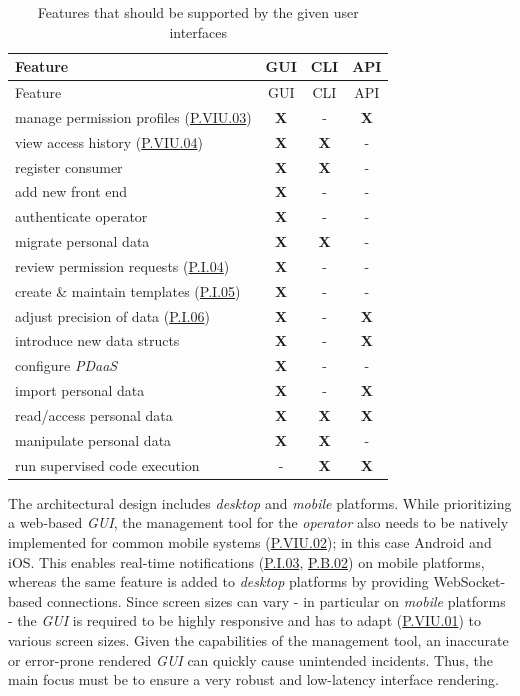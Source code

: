 \documentclass[12pt,english,a4paper,titlepage,cleardoublepage=empty,dottedtoc]{report}
\begin{document}
\begin{longtable}[]{@{}lccc@{}}
\caption{Features that should be supported by the given user interfaces
\label{tbl:ui-features}}\tabularnewline
\toprule
Feature & GUI & CLI & API\tabularnewline
\midrule
\endfirsthead
\toprule
Feature & GUI & CLI & API\tabularnewline
\midrule
\endhead
manage permission profiles (\protect\hyperlink{pviu03}{P.VIU.03}) &
\textbf{X} & - & \textbf{X}\tabularnewline
view access history (\protect\hyperlink{pviu04}{P.VIU.04}) & \textbf{X}
& \textbf{X} & -\tabularnewline
register consumer & \textbf{X} & \textbf{X} & -\tabularnewline
add new front end & \textbf{X} & - & -\tabularnewline
authenticate operator & \textbf{X} & - & -\tabularnewline
migrate personal data & \textbf{X} & \textbf{X} & -\tabularnewline
review permission requests (\protect\hyperlink{pi04}{P.I.04}) &
\textbf{X} & - & -\tabularnewline
create \& maintain templates (\protect\hyperlink{pi05}{P.I.05}) &
\textbf{X} & - & -\tabularnewline
adjust precision of data (\protect\hyperlink{pi06}{P.I.06}) & \textbf{X}
& - & \textbf{X}\tabularnewline
introduce new data structs & \textbf{X} & - & \textbf{X}\tabularnewline
configure \emph{PDaaS} & \textbf{X} & - & -\tabularnewline
import personal data & \textbf{X} & - & \textbf{X}\tabularnewline
read/access personal data & \textbf{X} & \textbf{X} &
\textbf{X}\tabularnewline
manipulate personal data & \textbf{X} & \textbf{X} & -\tabularnewline
run supervised code execution & - & \textbf{X} &
\textbf{X}\tabularnewline
\bottomrule
\end{longtable}

The architectural design includes \emph{desktop} and \emph{mobile}
platforms. While prioritizing a web-based \emph{GUI}, the management
tool for the \emph{operator} also needs to be natively implemented for
common mobile systems (\protect\hyperlink{pviu02}{P.VIU.02}); in this
case Android and iOS. This enables real-time notifications
(\protect\hyperlink{pi03}{P.I.03}, \protect\hyperlink{pb02}{P.B.02}) on
mobile platforms, whereas the same feature is added to \emph{desktop}
platforms by providing WebSocket-based connections. Since screen sizes
can vary - in particular on \emph{mobile} platforms - the \emph{GUI} is
required to be highly responsive and has to adapt
(\protect\hyperlink{pviu01}{P.VIU.01}) to various screen sizes. Given
the capabilities of the management tool, an inaccurate or error-prone
rendered \emph{GUI} can quickly cause unintended incidents. Thus, the
main focus must be to ensure a very robust and low-latency interface
rendering.
\end{document}
